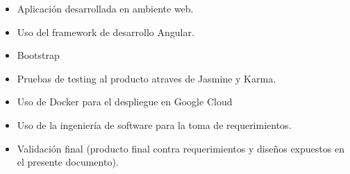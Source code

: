 \documentclass{article}
\begin{document}
\begin{itemize}
    \item Aplicación desarrollada en ambiente web.
    \item Uso del framework de desarrollo Angular.
    \item Bootstrap
    \item Pruebas de testing al producto atraves de Jasmine y Karma.
    \item Uso de Docker para el despliegue en Google Cloud
    \item Uso de la ingeniería de software para la toma de requerimientos.
    \item Validación final (producto final contra requerimientos y diseños expuestos en el presente documento).
\end{itemize}
\end{document}
